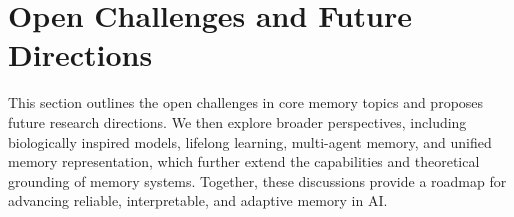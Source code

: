 \documentclass[manuscript,screen]{acmart}
\begin{document}

\section{Open Challenges and Future Directions}
\label{sec:future_direction}
This section outlines the open challenges in core memory topics and proposes future research directions.  We then explore broader perspectives, including biologically inspired models, lifelong learning, multi-agent memory, and unified memory representation, which further extend the capabilities and theoretical grounding of memory systems. Together, these discussions provide a roadmap for advancing reliable, interpretable, and adaptive memory in AI.
\end{document}

